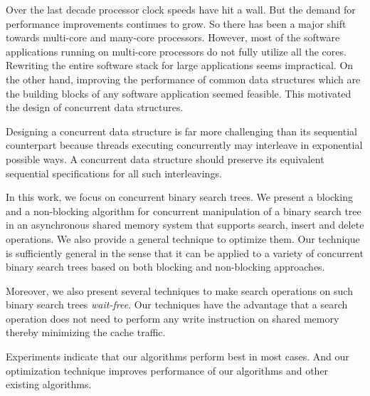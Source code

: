 Over the last decade processor clock speeds have hit a wall. But the demand for performance improvements continues to grow. So there has been a major shift towards multi-core and many-core processors. However, most of the software applications running on multi-core processors do not fully utilize all the cores. Rewriting the entire software stack for large applications seems impractical. On the other hand, improving the performance of common data structures which are the building blocks of any software application seemed feasible. This motivated the design of concurrent data structures. 

Designing a concurrent data structure is far more challenging than its sequential counterpart because threads executing concurrently may interleave in exponential possible ways. A concurrent data structure should preserve its equivalent sequential specifications for all such interleavings.

In this work, we focus on concurrent binary search trees. We present a blocking and a non-blocking algorithm for concurrent manipulation of a binary search tree in an asynchronous shared memory system that supports search, insert and delete operations. We also provide a general technique to optimize them. Our technique is sufficiently general in the sense that it can be applied to a variety of concurrent binary search trees based on both blocking and non-blocking approaches.

Moreover, we also present several techniques to make search operations on such binary search trees \emph{wait-free}. Our techniques have the advantage that a search operation does not need to perform any write instruction on shared memory thereby minimizing the cache traffic. 

Experiments indicate that our algorithms perform best in most cases. And our optimization technique improves performance of our algorithms and other existing algorithms. 